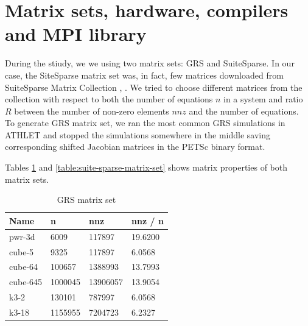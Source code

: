 \section{Matrix sets, hardware, compilers and MPI library} \label{subseq:matrix-sets-and-hardware}


During the stiudy, we we using two matrix sets: GRS and SuiteSparse. In our case, the SiteSparse matrix set was, in fact, few matrices downloaded from SuiteSparse Matrix Collection \cite{sparse-matrix-collection:1}, \cite{sparse-matrix-collection:2}. We tried to choose different matrices from the collection with respect to both the number of equations $n$ in a system and ratio $R$ between the number of non-zero elements $nnz$ and the number of equations.\\ 


To generate GRS matrix set, we ran the most common GRS simulations in ATHLET and stopped the simulations somewhere in the middle saving corresponding shifted Jacobian matrices in the PETSc binary format.\\

Tables \ref{table:grs-matrix-set}  and \ref{table:suite-sparse-matrix-set} shows matrix properties of both matrix sets.\\

\begin{table}[ht]
\centering
\begin{tabular}{|l|l|l|l|}
\hline
Name     & n       & nnz      & nnz / n \\ \hline
pwr-3d   & 6009    & 117897   & 19.6200 \\ \hline
cube-5   & 9325    & 117897   & 6.0568  \\ \hline
cube-64  & 100657  & 1388993  & 13.7993 \\ \hline
cube-645 & 1000045 & 13906057 & 13.9054 \\ \hline
k3-2     & 130101  & 787997   & 6.0568  \\ \hline
k3-18    & 1155955 & 7204723  & 6.2327  \\ \hline
\end{tabular}
\caption{GRS matrix set}
\label{table:grs-matrix-set}
\end{table}



